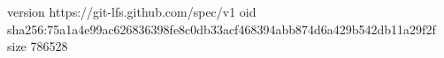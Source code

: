 version https://git-lfs.github.com/spec/v1
oid sha256:75a1a4e99ac626836398fe8c0db33acf468394abb874d6a429b542db11a29f2f
size 786528

